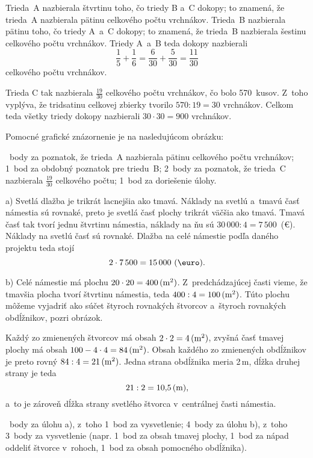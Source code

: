 {%
Trieda~A nazbierala štvrtinu toho, čo triedy B a~C dokopy;
to znamená, že trieda~A nazbierala pätinu celkového počtu vrchnákov.
Trieda~B nazbierala pätinu toho, čo triedy A~a~C dokopy;
to znamená, že trieda~B nazbierala šestinu celkového počtu vrchnákov.
Triedy A~a~B teda dokopy nazbierali
$$
\frac15+\frac16=\frac6{30}+\frac5{30}=\frac{11}{30}
$$
celkového počtu vrchnákov.

Trieda C tak nazbierala $\frac{19}{30}$ celkového počtu vrchnákov, čo bolo 570~kusov.
Z~toho vyplýva, že tridsatinu celkovej zbierky tvorilo $570:19=30$ vrchnákov.
Celkom teda všetky triedy dokopy nazbierali $30\cdot30=900$ vrchnákov.

Pomocné grafické znázornenie je na nasledujúcom obrázku:
%

~body za poznatok, že trieda~A nazbierala pätinu celkového počtu vrchnákov;
1~bod za obdobný poznatok pre triedu~B;
2~body za poznatok, že trieda~C nazbierala $\frac{19}{30}$ celkového počtu;
1~bod za doriešenie úlohy.
\endhodnotenie
}

{%
a)
Svetlá dlažba je trikrát lacnejšia ako tmavá.
Náklady na svetlú a~tmavú časť námestia sú rovnaké, preto je svetlá časť
plochy trikrát väčšia ako tmavá.
Tmavá časť tak tvorí jednu štvrtinu námestia, náklady na ňu sú
$30\,000:4=7\,500$~(\euro).
Náklady na svetlú časť sú rovnaké.
Dlažba na celé námestie podľa daného projektu teda stojí
$$
2\cdot7\,500=15\,000\ (\text{\euro}).
$$

b)
Celé námestie má plochu $20\cdot20=400\,(\text m^2)$.
Z~predchádzajúcej časti vieme, že tmavšia plocha tvorí štvrtinu námestia, teda
$400:4=100\,(\text m^2)$.
Túto plochu môžeme vyjadriť ako súčet štyroch rovnakých štvorcov a~štyroch
rovnakých obdĺžnikov, pozri obrázok.
%

Každý zo zmienených štvorcov má obsah $2\cdot2=4\,(\text m^2)$,
zvyšná časť tmavej plochy má obsah $100-4\cdot4=84\,(\text m^2)$.
Obsah každého zo zmienených obdĺžnikov je preto rovný $84:4=21\,(\text m^2)$.
Jedna strana obdĺžnika meria 2\,m, dĺžka druhej strany je teda
$$
21:2=10{,}5\,(\text m),
$$
a~to je zároveň dĺžka strany svetlého štvorca v~centrálnej časti námestia.

~body za úlohu a), z~toho 1~bod za vysvetlenie;
4~body za úlohu b), z~toho 3~body za vysvetlenie
(napr. 1~bod za obsah tmavej plochy, 1~bod za nápad oddeliť štvorce v~rohoch,
1~bod za obsah pomocného obdĺžnika).
\endhodnotenie
}

